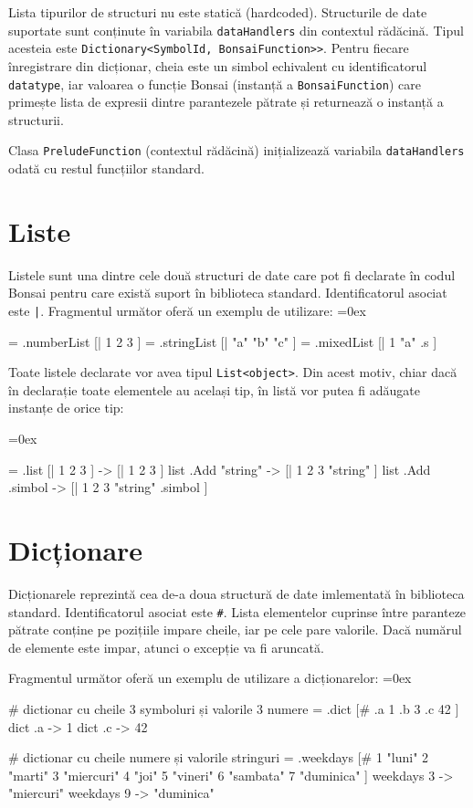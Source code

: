 \documentclass[12pt,a4paper]{memoir}
\renewcommand{\c}{\texttt}
\newenvironment{code}
{
\definecolor{shadecolor}{gray}{0.91}
\topsep=0ex
\relax
\shaded
\verbatim
}
{
\endverbatim
\endshaded
}
\begin{document}
Lista tipurilor de structuri nu este statică (hardcoded). Structurile de date suportate sunt conținute în variabila \c{dataHandlers} din contextul rădăcină. Tipul acesteia este \c{Dictionary<SymbolId, BonsaiFunction>>}. Pentru fiecare înregistrare din dicționar, cheia este un simbol echivalent cu identificatorul \c{datatype}, iar valoarea o funcție Bonsai (instanță a \c{BonsaiFunction}) care primește lista de expresii dintre parantezele pătrate și returnează o instanță a structurii.

Clasa \c{PreludeFunction} (contextul rădăcină) inițializează variabila \c{dataHandlers} odată cu restul funcțiilor standard.

\section{Liste}

Listele sunt una dintre cele două structuri de date care pot fi declarate în codul Bonsai pentru care există suport în biblioteca standard. Identificatorul asociat este \c{|}. Fragmentul următor oferă un exemplu de utilizare:
\begin{code}
= .numberList [| 1 2 3 ]
= .stringList [| "a" "b" "c" ]
= .mixedList [| 1 "a" .s ]
\end{code}

Toate listele declarate vor avea tipul \c{List<object>}. Din acest motiv, chiar dacă în declarație toate elementele au același tip, în listă vor putea fi adăugate instanțe de orice tip:

\begin{code}
= .list [| 1 2 3 ]
  -> [| 1 2 3 ]
list .Add "string"
  -> [| 1 2 3 "string" ]
list .Add .simbol
  -> [| 1 2 3 "string" .simbol ]
\end{code}

\section{Dicționare}

Dicționarele reprezintă cea de-a doua structură de date imlementată în biblioteca standard. Identificatorul asociat este \c{\#}. Lista elementelor cuprinse între paranteze pătrate conține pe pozițiile impare cheile, iar pe cele pare valorile. Dacă numărul de elemente este impar, atunci o excepție va fi aruncată.

Fragmentul următor oferă un exemplu de utilizare a dicționarelor:
\begin{code}
# dictionar cu cheile 3 symboluri și valorile 3 numere
= .dict [# .a 1 .b 3 .c 42 ]
dict .a 
  -> 1
dict .c
  -> 42

# dictionar cu cheile numere și valorile stringuri
= .weekdays [#
  1 "luni" 
  2 "marti" 
  3 "miercuri"
  4 "joi"
  5 "vineri"
  6 "sambata"
  7 "duminica"
]
weekdays 3
  -> "miercuri"
weekdays 9
  -> "duminica"
\end{code}
\end{document}
